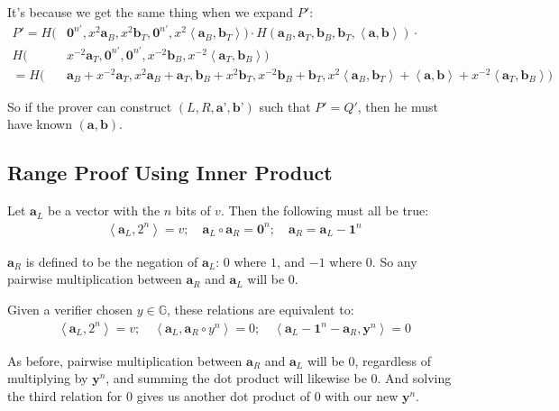\documentclass{article}
\begin{document}
It's because we get the same thing when we expand $P'$:
\begin{align}
  P' = H(&\textbf{0}^{n'}, x^2 \textbf{a}_{B}, x^2 \textbf{b}_{T}, \textbf{0}^{n'}, x^2 \left<\textbf{a}_{B}, \textbf{b}_{T}\right>) \cdot 
       H(\textbf{a}_{B}, \textbf{a}_{T}, \textbf{b}_{B}, \textbf{b}_{T}, \left<\textbf{a}, \textbf{b}\right>) \cdot \nonumber\\
       H(&x^{-2} \textbf{a}_{T}, \textbf{0}^{n'}, \textbf{0}^{n'}, x^{-2} \textbf{b}_{B}, x^{-2} \left<\textbf{a}_{T}, \textbf{b}_{B}\right>)\nonumber\\
     = H(&\textbf{a}_{B} + x^{-2} \textbf{a}_{T}, x^2 \textbf{a}_{B} + \textbf{a}_{T},
          \textbf{b}_{B} + x^2 \textbf{b}_{T}, x^{-2} \textbf{b}_{B} + \textbf{b}_{T},
          x^2 \left<\textbf{a}_{B}, \textbf{b}_{T}\right> + \left<\textbf{a}, \textbf{b}\right> + x^{-2} \left<\textbf{a}_{T}, \textbf{b}_{B}\right>)
\end{align}

So if the prover can construct $(L, R, \textbf{a'}, \textbf{b'})$ such that $P' = Q'$, then he must have known $(\textbf{a}, \textbf{b})$.


\subsection{Range Proof Using Inner Product}

Let $\textbf{a}_L$ be a vector with the $n$ bits of $v$.  Then the following must all be true:
\begin{align}
  \left<\textbf{a}_L, 2^n\right> = v ;\quad \textbf{a}_L \circ  \textbf{a}_R = \textbf{0}^n ;\quad \textbf{a}_R = \textbf{a}_L - \textbf{1}^n
\end{align}
  
$\textbf{a}_R$ is defined to be the negation of $\textbf{a}_L$: $0$ where $1$, and $-1$ where $0$.  So any pairwise multiplication between $\textbf{a}_R$ and $\textbf{a}_L$ will be $0$.

Given a verifier chosen $y \in \mathbb{G}$, these relations are equivalent to:
\begin{align}
  \left<\textbf{a}_L, 2^n\right> = v ;\quad \left<\textbf{a}_L, \textbf{a}_R \circ y^n\right> = 0 ;\quad \left<\textbf{a}_L - \textbf{1}^n - \textbf{a}_R, \textbf{y}^n\right> = 0
\end{align}

As before, pairwise multiplication between $\textbf{a}_R$ and $\textbf{a}_L$ will be $0$, regardless of multiplying by $\textbf{y}^n$, and summing the dot product will likewise be $0$. And solving the third relation for $0$ gives us another dot product of $0$ with our new $\textbf{y}^n$.
\end{document}
